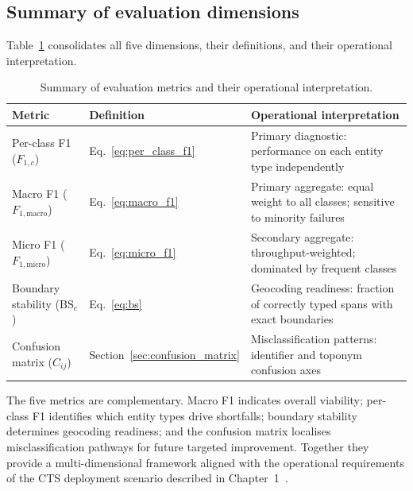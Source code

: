 \subsection{Summary of evaluation dimensions}

Table~\ref{tab:eval_summary} consolidates all five dimensions, their definitions, and their operational interpretation.

\begin{table}[H]
\centering
\caption{Summary of evaluation metrics and their operational interpretation.}
\label{tab:eval_summary}
\renewcommand{\arraystretch}{1.3}
\begin{tabular}{lp{2.8cm}p{5.4cm}}
\toprule
\textbf{Metric}                          & \textbf{Definition}                    & \textbf{Operational interpretation} \\
\midrule
Per-class F1 ($F_{1,c}$)                 & Eq.~\eqref{eq:per_class_f1}            & Primary diagnostic: performance on each entity type independently \\
Macro F1 ($F_{1,\text{macro}}$)          & Eq.~\eqref{eq:macro_f1}               & Primary aggregate: equal weight to all classes; sensitive to minority failures \\
Micro F1 ($F_{1,\text{micro}}$)          & Eq.~\eqref{eq:micro_f1}               & Secondary aggregate: throughput-weighted; dominated by frequent classes \\
Boundary stability ($\mathrm{BS}_c$)     & Eq.~\eqref{eq:bs}                      & Geocoding readiness: fraction of correctly typed spans with exact boundaries \\
Confusion matrix ($C_{ij}$)              & Section~\ref{sec:confusion_matrix}     & Misclassification patterns: identifier and toponym confusion axes \\
\bottomrule
\end{tabular}
\end{table}

The five metrics are complementary. Macro F1 indicates overall viability; per-class F1 identifies which entity types drive shortfalls; boundary stability determines geocoding readiness; and the confusion matrix localises misclassification pathways for future targeted improvement. Together they provide a multi-dimensional framework aligned with the operational requirements of the CTS deployment scenario described in Chapter~1~\cite{keraghel2024survey}.
